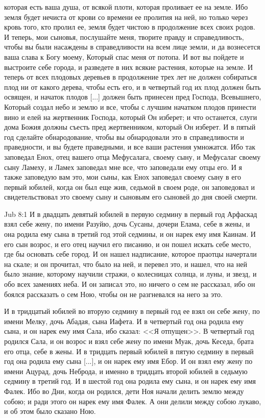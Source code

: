 которая есть ваша душа, от всякой плоти, которая
проливает ее на земле. Ибо земля будет нечиста от
крови со времени ее пролития на ней, но только через
кровь того, кто пролил ее, земля будет чистою в
продолжение всех своих родов. И теперь, мои
сыновья, послушайте меня, творите правду и
справедливость, чтобы вы были насаждены в
справедливости на всем лице земли, и да
вознесется ваша слава к Богу моему, Который спас
меня от потопа. И вот вы пойдете и выстроите себе
города, и разведете в них всякие растения,
которые на земле. И теперь от всех плодовых
деревьев в продолжение трех лет не должен
собираться плод ни от какого дерева, чтобы
есть его, и в четвертый год их плод должен быть
освящен, и начаток плодов [...] должен быть
принесен пред Господа, Всевышнего, Который
создал небо и землю и все, чтобы с лучшим начатком
плодов принести вино и елей на жертвенник
Господа, который Он изберет; и что останется,
слуги дома Божия должны съесть пред
жертвенником, который Он изберет. И в пятый год
сделайте обнародование, чтобы вы обнародовали
это в справедливости и праведности, и вы будете
праведными, и все ваши растения умножатся. Ибо
так заповедал Енох, отец вашего отца Мефусалага,
своему сыну, и Мефусалаг своему сыну Ламеху, и
Ламех заповедал мне все, что заповедали ему отцы
его. И я также заповедую вам это, мои сыны, как
Енох заповедал своему сыну в его первый юбилей,
когда он был еще жив, седьмой в своем роде, он
заповедовал и свидетельствовал это своему сыну и
сыновьям его сыновей до дня своей смерти.

\vs Jub 8:1
И в двадцать девятый юбилей в первую седмину в
первый год Арфаскад взял себе жену, по имени
Разуйю, дочь Сусаны, дочери Елама, себе в жены, и
она родила ему сына в третий год этой седмины, и
он нарек ему имя Каинам. И его сын возрос, и его
отец научил его писанию, и он пошел искать себе
место, где бы основать себе город. И он нашел
надписание, которое праотцы начертали на скале; и
он прочитал, что было на ней, и перевел это, и
нашел, что на ней было знание, которому научили
стражи, о колесницах солнца, и луны, и звезд, и обо
всех замениях неба. И он записал это, но ничего о
сем не рассказал, ибо он боялся рассказать о сем
Ною, чтобы он не разгневался на него за это.

И в тридцатый юбилей во вторую седмину в первый
год ее взял он себе жену, по имени Мелку, дочь
Абадая, сына Иафета. И в четвертый год она родила
ему сына, и он нарек ему имя Сала, ибо сказал: <<Я
отпущен>>. В четвертый год родился Сала, и он
возрос и взял себе жену по имени Муак, дочь
Кеседа, брата его отца, себе в жены. И в тридцать
первый юбилей в пятую седмину в первый год она
родила ему сына [...], и он нарек ему имя Ебор. И он
взял ему жену по имени Ацурад, дочь Неброда, и
именно в тридцать второй юбилей в седьмую
седмину в третий год. И в шестой год она родила
ему сына, и он нарек ему имя Фалек. Ибо во Дни,
когда он родился, дети Ноя начали делить землю
между собою; и ради этого он нарек ему имя Фалек. А
они делили между собою лукаво, и об этом было
сказано Ною.

